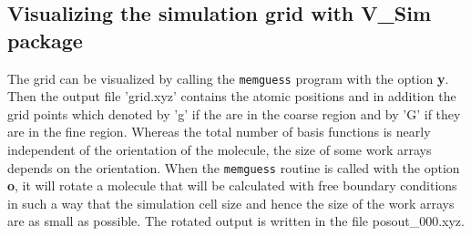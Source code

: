 \documentclass[a4paper,11pt]{report}
\begin{document}
\subsection{Visualizing the simulation grid with V\_Sim package}
The grid can be visualized by calling the \texttt{memguess} program 
with the option {\bf y}. Then the output file 'grid.xyz' contains the atomic positions and in addition 
the grid points which denoted by 'g' if the are in the coarse region and by 'G' if they are in the fine region. 
Whereas the total number of basis functions is nearly independent of the orientation of the molecule, the size of some 
work arrays depends on the orientation. When the \texttt{memguess} routine is called with the option {\bf o}, it will rotate 
a molecule that will be calculated with free boundary conditions in such a way that the simulation cell size and 
hence the size of the work arrays are as small as 
possible. The rotated output is written in the file posout\_000.xyz.
\end{document}
